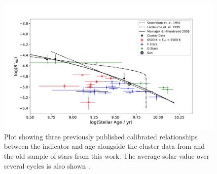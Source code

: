 \begin{figure}
    \centering
    \includegraphics[scale=0.55]{Figures/4-Chromospheric_age/ca_results_3_relationship.pdf}
    \caption[Comparison of sample to previous age-activity relationships]{Plot showing three previously published calibrated relationships between the \Rprime indicator and age \citep{Soderblom_etal_1991,Lachaume_etal_1999,Mamajek_Hillenbrand_2008} alongside the cluster data from \citet{Mamajek_Hillenbrand_2008} and the old sample of stars from this work. The average solar value over several cycles is also shown \citep{Egeland_etal_2017}.}
    \label{fig:comparison_previous_relationships_ca}
\end{figure}

